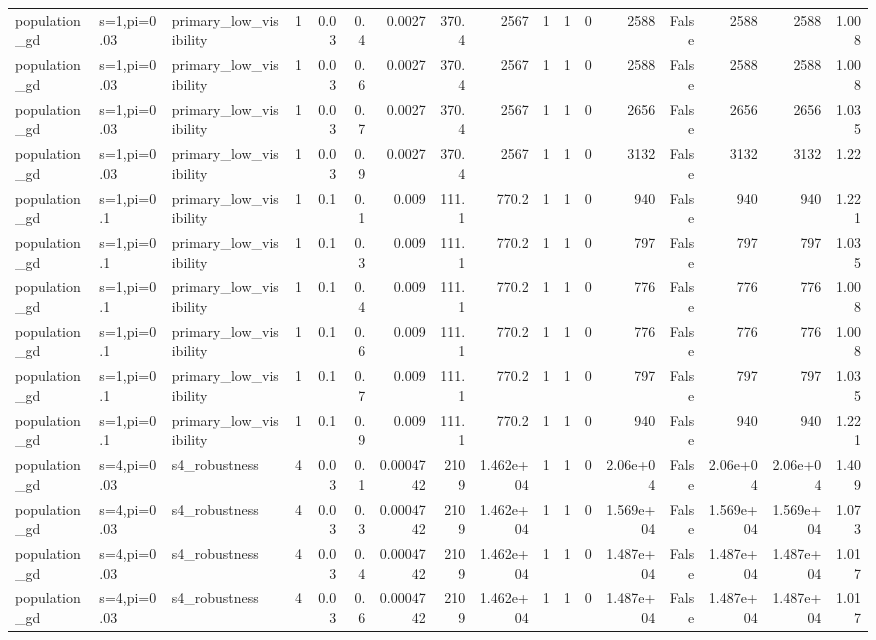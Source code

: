 \begin{tabular}{lllrrrrrrrrrrrrrr}
population_gd & s=1,pi=0.03 & primary_low_visibility & 1 & 0.03 & 0.4 & 0.0027 & 370.4 & 2567 & 1 & 1 & 0 & 2588 & False & 2588 & 2588 & 1.008 \\
population_gd & s=1,pi=0.03 & primary_low_visibility & 1 & 0.03 & 0.6 & 0.0027 & 370.4 & 2567 & 1 & 1 & 0 & 2588 & False & 2588 & 2588 & 1.008 \\
population_gd & s=1,pi=0.03 & primary_low_visibility & 1 & 0.03 & 0.7 & 0.0027 & 370.4 & 2567 & 1 & 1 & 0 & 2656 & False & 2656 & 2656 & 1.035 \\
population_gd & s=1,pi=0.03 & primary_low_visibility & 1 & 0.03 & 0.9 & 0.0027 & 370.4 & 2567 & 1 & 1 & 0 & 3132 & False & 3132 & 3132 & 1.22 \\
population_gd & s=1,pi=0.1 & primary_low_visibility & 1 & 0.1 & 0.1 & 0.009 & 111.1 & 770.2 & 1 & 1 & 0 & 940 & False & 940 & 940 & 1.221 \\
population_gd & s=1,pi=0.1 & primary_low_visibility & 1 & 0.1 & 0.3 & 0.009 & 111.1 & 770.2 & 1 & 1 & 0 & 797 & False & 797 & 797 & 1.035 \\
population_gd & s=1,pi=0.1 & primary_low_visibility & 1 & 0.1 & 0.4 & 0.009 & 111.1 & 770.2 & 1 & 1 & 0 & 776 & False & 776 & 776 & 1.008 \\
population_gd & s=1,pi=0.1 & primary_low_visibility & 1 & 0.1 & 0.6 & 0.009 & 111.1 & 770.2 & 1 & 1 & 0 & 776 & False & 776 & 776 & 1.008 \\
population_gd & s=1,pi=0.1 & primary_low_visibility & 1 & 0.1 & 0.7 & 0.009 & 111.1 & 770.2 & 1 & 1 & 0 & 797 & False & 797 & 797 & 1.035 \\
population_gd & s=1,pi=0.1 & primary_low_visibility & 1 & 0.1 & 0.9 & 0.009 & 111.1 & 770.2 & 1 & 1 & 0 & 940 & False & 940 & 940 & 1.221 \\
population_gd & s=4,pi=0.03 & s4_robustness & 4 & 0.03 & 0.1 & 0.0004742 & 2109 & 1.462e+04 & 1 & 1 & 0 & 2.06e+04 & False & 2.06e+04 & 2.06e+04 & 1.409 \\
population_gd & s=4,pi=0.03 & s4_robustness & 4 & 0.03 & 0.3 & 0.0004742 & 2109 & 1.462e+04 & 1 & 1 & 0 & 1.569e+04 & False & 1.569e+04 & 1.569e+04 & 1.073 \\
population_gd & s=4,pi=0.03 & s4_robustness & 4 & 0.03 & 0.4 & 0.0004742 & 2109 & 1.462e+04 & 1 & 1 & 0 & 1.487e+04 & False & 1.487e+04 & 1.487e+04 & 1.017 \\
population_gd & s=4,pi=0.03 & s4_robustness & 4 & 0.03 & 0.6 & 0.0004742 & 2109 & 1.462e+04 & 1 & 1 & 0 & 1.487e+04 & False & 1.487e+04 & 1.487e+04 & 1.017 \\

\end{tabular}
